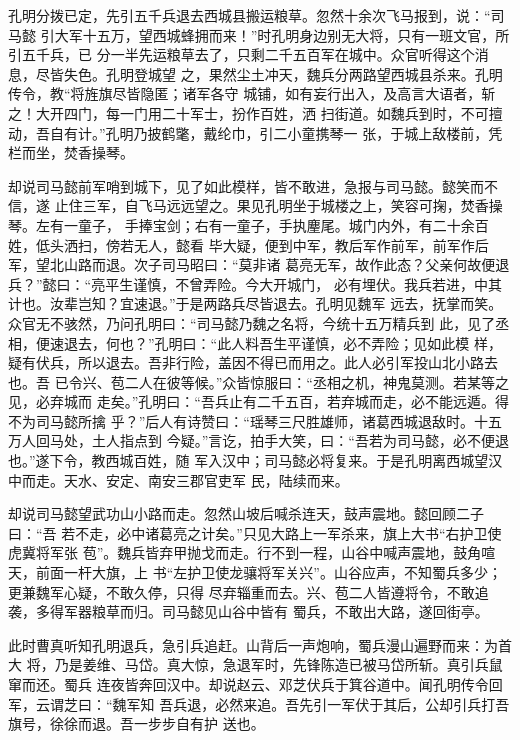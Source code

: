 孔明分拨已定，先引五千兵退去西城县搬运粮草。忽然十余次飞马报到，说：“司马懿
引大军十五万，望西城蜂拥而来！”时孔明身边别无大将，只有一班文官，所引五千兵，已
分一半先运粮草去了，只剩二千五百军在城中。众官听得这个消息，尽皆失色。孔明登城望
之，果然尘土冲天，魏兵分两路望西城县杀来。孔明传令，教“将旌旗尽皆隐匿；诸军各守
城铺，如有妄行出入，及高言大语者，斩之！大开四门，每一门用二十军士，扮作百姓，洒
扫街道。如魏兵到时，不可擅动，吾自有计。”孔明乃披鹤氅，戴纶巾，引二小童携琴一
张，于城上敌楼前，凭栏而坐，焚香操琴。

却说司马懿前军哨到城下，见了如此模样，皆不敢进，急报与司马懿。懿笑而不信，遂
止住三军，自飞马远远望之。果见孔明坐于城楼之上，笑容可掬，焚香操琴。左有一童子，
手捧宝剑；右有一童子，手执麈尾。城门内外，有二十余百姓，低头洒扫，傍若无人，懿看
毕大疑，便到中军，教后军作前军，前军作后军，望北山路而退。次子司马昭曰：“莫非诸
葛亮无军，故作此态？父亲何故便退兵？”懿曰：“亮平生谨慎，不曾弄险。今大开城门，
必有埋伏。我兵若进，中其计也。汝辈岂知？宜速退。”于是两路兵尽皆退去。孔明见魏军
远去，抚掌而笑。众官无不骇然，乃问孔明曰：“司马懿乃魏之名将，今统十五万精兵到
此，见了丞相，便速退去，何也？”孔明曰：“此人料吾生平谨慎，必不弄险；见如此模
样，疑有伏兵，所以退去。吾非行险，盖因不得已而用之。此人必引军投山北小路去也。吾
已令兴、苞二人在彼等候。”众皆惊服曰：“丞相之机，神鬼莫测。若某等之见，必弃城而
走矣。”孔明曰：“吾兵止有二千五百，若弃城而走，必不能远遁。得不为司马懿所擒
乎？”后人有诗赞曰：“瑶琴三尺胜雄师，诸葛西城退敌时。十五万人回马处，土人指点到
今疑。”言讫，拍手大笑，曰：“吾若为司马懿，必不便退也。”遂下令，教西城百姓，随
军入汉中；司马懿必将复来。于是孔明离西城望汉中而走。天水、安定、南安三郡官吏军
民，陆续而来。

却说司马懿望武功山小路而走。忽然山坡后喊杀连天，鼓声震地。懿回顾二子曰：“吾
若不走，必中诸葛亮之计矣。”只见大路上一军杀来，旗上大书“右护卫使虎冀将军张
苞”。魏兵皆弃甲抛戈而走。行不到一程，山谷中喊声震地，鼓角喧天，前面一杆大旗，上
书“左护卫使龙骧将军关兴”。山谷应声，不知蜀兵多少；更兼魏军心疑，不敢久停，只得
尽弃辎重而去。兴、苞二人皆遵将令，不敢追袭，多得军器粮草而归。司马懿见山谷中皆有
蜀兵，不敢出大路，遂回街亭。

此时曹真听知孔明退兵，急引兵追赶。山背后一声炮响，蜀兵漫山遍野而来：为首大
将，乃是姜维、马岱。真大惊，急退军时，先锋陈造已被马岱所斩。真引兵鼠窜而还。蜀兵
连夜皆奔回汉中。却说赵云、邓芝伏兵于箕谷道中。闻孔明传令回军，云谓芝曰：“魏军知
吾兵退，必然来追。吾先引一军伏于其后，公却引兵打吾旗号，徐徐而退。吾一步步自有护
送也。

